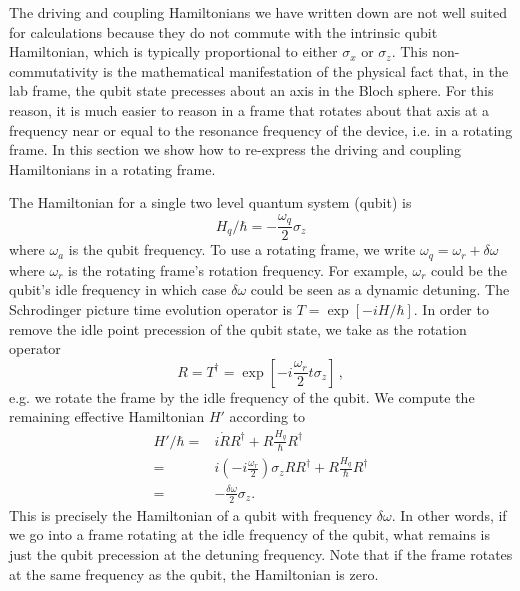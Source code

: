 
The driving and coupling Hamiltonians we have written down are not well suited for calculations because they do not commute with the intrinsic qubit Hamiltonian, which is typically proportional to either $\sigma_x$ or $\sigma_z$.
This non-commutativity is the mathematical manifestation of the physical fact that, in the lab frame, the qubit state precesses about an axis in the Bloch sphere.
For this reason, it is much easier to reason in a frame that rotates about that axis at a frequency near or equal to the resonance frequency of the device, i.e. in a rotating frame.
In this section we show how to re-express the driving and coupling Hamiltonians in a rotating frame.

The Hamiltonian for a single two level quantum system (qubit) is \begin{equation}
H_q/\hbar = -\frac{\omega_q}{2}\sigma_z \end{equation}
where $\omega_a$ is the qubit frequency.
To use a rotating frame, we write $\omega_q = \omega_r + \delta\omega$ where $\omega_r$ is the rotating frame's rotation frequency.
For example, $\omega_r$ could be the qubit's idle frequency in which case $\delta \omega$ could be seen as a dynamic detuning.
The Schrodinger picture time evolution operator is $T=\exp \left[-i H/\hbar \right]$.
In order to remove the idle point precession of the qubit state, we take as the rotation operator \begin{equation}
  R = T^{\dagger} = \exp \left[ -i \frac{\omega_r}{2} t \sigma_z \right] \, ,
\end{equation}
e.g. we rotate the frame by the idle frequency of the qubit.
We compute the remaining effective Hamiltonian $H'$ according to 
\begin{align}
  H'/\hbar
  =& i\dot{R}R^{\dagger} + R \frac{H_q}{\hbar} R^\dagger \nonumber \\
  =& i \left(-i \frac{\omega_r}{2} \right)\sigma_z RR^{\dagger}
    + R\frac{H_q}{\hbar}R^{\dagger} \nonumber \\
  =& -\frac{\delta\omega}{2}\sigma_z.
\end{align}
This is precisely the Hamiltonian of a qubit with frequency $\delta\omega$.
In other words, if we go into a frame rotating at the idle frequency of the qubit, what remains is just the qubit precession at the detuning frequency.
Note that if the frame rotates at the same frequency as the qubit, the Hamiltonian is zero.

